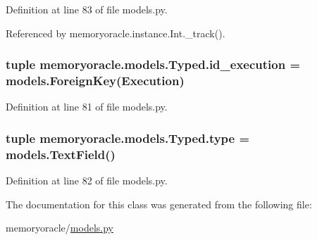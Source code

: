 Definition at line 83 of file models.\+py.



Referenced by memoryoracle.\+instance.\+Int.\+\_\+track().

\hypertarget{classmemoryoracle_1_1models_1_1Typed_aeb96a1c604799fdc2062a0bc899af65f}{}
\subsubsection[{id\+\_\+execution}]{\setlength{\rightskip}{0pt plus 5cm}tuple memoryoracle.\+models.\+Typed.\+id\+\_\+execution = models.\+Foreign\+Key({\bf Execution})\hspace{0.3cm}{\ttfamily [static]}}\label{classmemoryoracle_1_1models_1_1Typed_aeb96a1c604799fdc2062a0bc899af65f}


Definition at line 81 of file models.\+py.

\hypertarget{classmemoryoracle_1_1models_1_1Typed_af49ed49f278da3379e07f6260842a7ba}{}
\subsubsection[{type}]{\setlength{\rightskip}{0pt plus 5cm}tuple memoryoracle.\+models.\+Typed.\+type = models.\+Text\+Field()\hspace{0.3cm}{\ttfamily [static]}}\label{classmemoryoracle_1_1models_1_1Typed_af49ed49f278da3379e07f6260842a7ba}


Definition at line 82 of file models.\+py.



The documentation for this class was generated from the following file\+:\begin{DoxyCompactItemize}
\item 
memoryoracle/\hyperlink{models_8py}{models.\+py}\end{DoxyCompactItemize}
